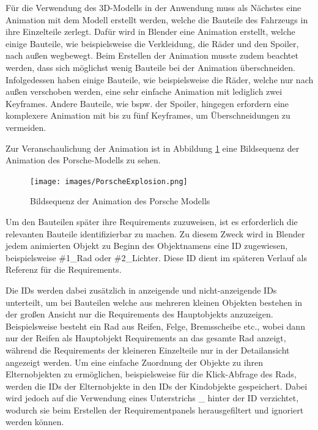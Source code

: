 Für die Verwendung des 3D-Modells in der Anwendung muss als Nächstes eine Animation mit dem Modell erstellt werden, welche die Bauteile des Fahrzeugs in ihre Einzelteile zerlegt.
Dafür wird in Blender eine Animation erstellt, welche einige Bauteile, wie beispielsweise die Verkleidung, die Räder und den Spoiler, nach außen wegbewegt.
Beim Erstellen der Animation musste zudem beachtet werden, dass sich möglichst wenig Bauteile bei der Animation überschneiden.
Infolgedessen haben einige Bauteile, wie beispielsweise die Räder, welche nur nach außen verschoben werden, eine sehr einfache Animation mit lediglich zwei Keyframes.
Andere Bauteile, wie bspw. der Spoiler, hingegen erfordern eine komplexere Animation mit bis zu fünf Keyframes, um Überschneidungen zu vermeiden.

\newpage

Zur Veranschaulichung der Animation ist in Abbildung \ref{fig:porsche-explosion} eine Bildsequenz der Animation des Porsche-Modells zu sehen.

\begin{figure}[H]
    \centering
    \texttt{[image: images/PorscheExplosion.png]}
    \caption{Bildsequenz der Animation des Porsche Modells}
    \label{fig:porsche-explosion}
\end{figure}

Um den Bauteilen später ihre Requirements zuzuweisen, ist es erforderlich die relevanten Bauteile identifizierbar zu machen.
Zu diesem Zweck wird in Blender jedem animierten Objekt zu Beginn des Objektnamens eine ID zugewiesen, beispielsweise \glqq{}\#1\_Rad\grqq{} oder \glqq{}\#2\_Lichter\grqq{}.
Diese ID dient im späteren Verlauf als Referenz für die Requirements.

Die IDs werden dabei zusätzlich in anzeigende und nicht-anzeigende IDs unterteilt, um bei Bauteilen welche aus mehreren kleinen Objekten bestehen in der großen Ansicht nur die Requirements des Hauptobjekts anzuzeigen.
Beispielsweise besteht ein Rad aus Reifen, Felge, Bremsscheibe etc., wobei dann nur der Reifen als Hauptobjekt Requirements an das gesamte Rad anzeigt, während die Requirements der kleineren Einzelteile nur in der Detailansicht angezeigt werden.
Um eine einfache Zuordnung der Objekte zu ihren Elternobjekten zu ermöglichen, beispielsweise für die Klick-Abfrage des Rads, werden die IDs der Elternobjekte in den IDs der Kindobjekte gespeichert.
Dabei wird jedoch auf die Verwendung eines Unterstrichs \glqq{}\_\grqq{} hinter der ID verzichtet, wodurch sie beim Erstellen der Requirementpanels herausgefiltert und ignoriert werden können.

